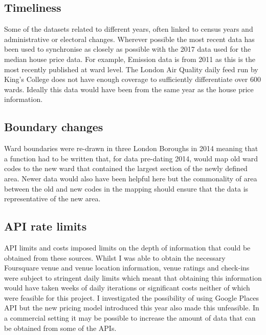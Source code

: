\subsection{Timeliness}

Some of the datasets related to different years, often linked to census years and administrative or electoral changes.
Wherever possible the most recent data has been used to synchronise as closely as possible with the 2017 data used for the median house price data. For example, Emission data is from 2011 as this is the most recently published at ward level. The London Air Quality daily feed run by King’s College does not have enough coverage to sufficiently differentiate over 600 wards. Ideally this data would have been from the same year as the house price information.


\subsection{Boundary changes}
Ward boundaries were re-drawn in three London Boroughs in 2014 meaning that a function had to be written that, for data pre-dating 2014, would map old ward codes to the new ward that contained the largest section of the newly defined area. Newer data would also have been helpful here but the commonality of area between the old and new codes in the mapping should ensure that the data is representative of the new area.

\subsection{API rate limits}

API limits and costs imposed limits on the depth of information that could be obtained from these sources. Whilst I was able to obtain the necessary Foursquare venue and venue location information, venue ratings and check-ins were subject to stringent daily limits which meant that obtaining this information would have taken weeks of daily iterations or significant costs neither of which were feasible for this project. I investigated the possibility of using Google Places API but the new pricing model introduced this year also made this unfeasible. In a commercial setting it may be possible to increase the amount of data that can be obtained from some of the APIs.
